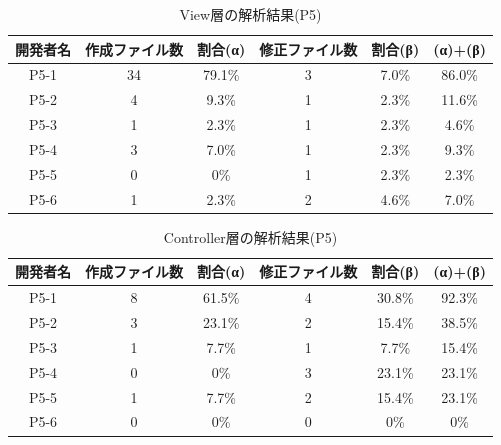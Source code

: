 \documentclass{funthesis}
\begin{document}
\begin{table}[H]
  \begin{center}
\begin{tabular}{|c|c|c|c|c||c|}\hline
開発者名&作成ファイル数&割合(α)&修正ファイル数&割合(β)&(α)+(β)\\ \hline
P5-1 & 34 & 79.1\% & 3 & 7.0\% & 86.0\%\\ \hline \hline
P5-2 & 4 & 9.3\% & 1 & 2.3\% & 11.6\%\\ \hline \hline
P5-3 & 1 & 2.3\% & 1 & 2.3\% & 4.6\%\\ \hline \hline
P5-4 & 3 & 7.0\% & 1 & 2.3\% & 9.3\%\\ \hline \hline
P5-5 & 0 & 0\% & 1 & 2.3\% & 2.3\%\\ \hline \hline
P5-6 & 1 & 2.3\% & 2 & 4.6\% & 7.0\%\\ \hline 
\end{tabular}    
\caption{View層の解析結果(P5)}    \label{sample}
  \end{center}
\end{table}\begin{table}[H]
  \begin{center}
\begin{tabular}{|c|c|c|c|c||c|}\hline
開発者名&作成ファイル数&割合(α)&修正ファイル数&割合(β)&(α)+(β)\\ \hline
P5-1 & 8 & 61.5\% & 4 & 30.8\% & 92.3\%\\ \hline \hline
P5-2 & 3 & 23.1\% & 2 & 15.4\% & 38.5\%\\ \hline \hline
P5-3 & 1 & 7.7\% & 1 & 7.7\% & 15.4\%\\ \hline \hline
P5-4 & 0 & 0\% & 3 & 23.1\% & 23.1\%\\ \hline \hline
P5-5 & 1 & 7.7\% & 2 & 15.4\% & 23.1\%\\ \hline \hline
P5-6 & 0 & 0\% & 0 & 0\% & 0\%\\ \hline 
\end{tabular}    
\caption{Controller層の解析結果(P5)}    \label{sample}
  \end{center}
\end{table}
\end{document}
